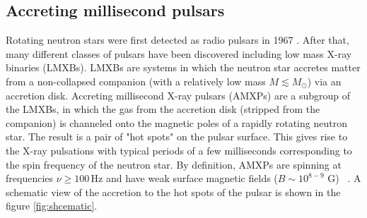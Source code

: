 \documentclass{wihuri}
\begin{document}



\subsection{Accreting millisecond pulsars}






Rotating neutron stars were first detected as radio pulsars in 1967 \cite{gold68}. %
After that, many different classes of pulsars have been discovered including low mass X-ray binaries (LMXBs). LMXBs are systems in which the neutron star accretes matter from a non-collapsed companion (with a relatively low mass $M \lesssim  M_{\odot}$) via an accretion disk. Accreting millisecond X-ray pulsars (AMXPs) are a subgroup of the LMXBs, in which the gas from the accretion disk (stripped from the companion) is channeled onto the magnetic poles of a rapidly rotating neutron star. The result is a pair of "hot spots" on the pulsar surface.  This gives rise to the X-ray pulsations with typical periods of a few milliseconds corresponding to the spin frequency of the neutron star. By definition, AMXPs are spinning at frequencies $\nu \ge 100 \, \mathrm{Hz}$ and have weak surface magnetic fields ($B \sim 10^{8-9}$ G) ~\cite{patruno}. A schematic view of the accretion to the hot spots of the pulsar is shown in the figure \ref{fig:shcematic}.
\end{document}
